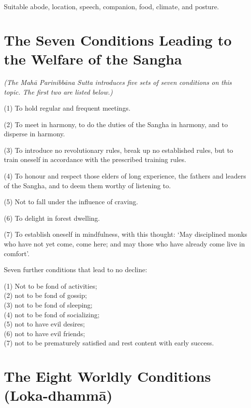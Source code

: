 
Suitable abode, location, speech, companion, food, climate, and posture.


\ifhandbookedition
\vspace*{-\baselineskip}
\fi

\section*{The Seven Conditions Leading to the Welfare of the Sangha}

\emph{(The Mahā Parinibbāna Sutta introduces five sets of seven conditions on
  this topic. The first two are listed below.)}

(1) To hold regular and frequent meetings.

(2) To meet in harmony, to do the duties of the Sangha in harmony, and to disperse
in harmony.

(3) To introduce no revolutionary rules, break up no established rules, but
to train oneself in accordance with the prescribed training rules.

(4) To honour and respect those elders of long experience, the fathers and leaders
of the Sangha, and to deem them worthy of listening to.

(5) Not to fall under the influence of craving.

(6) To delight in forest dwelling.

(7) To establish oneself in mindfulness, with this thought: ‘May disciplined monks
who have not yet come, come here; and may those who have already come live in
comfort’.


Seven further conditions that lead to no decline:

(1) Not to be fond of activities;\\
(2) not to be fond of gossip;\\
(3) not to be fond of sleeping;\\
(4) not to be fond of socializing;\\
(5) not to have evil desires;\\
(6) not to have evil friends;\\
(7) not to be prematurely satisfied and rest content with early success.


\section*{The Eight Worldly Conditions (Loka-dhammā)}

